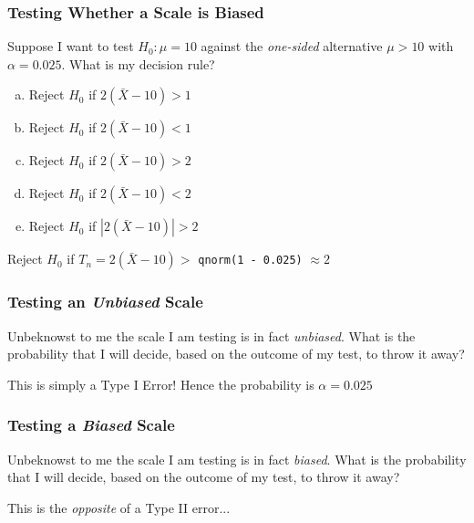 \documentclass{beamer}
\begin{document}
\begin{frame}[t]
	\frametitle{Testing Whether a Scale is Biased }

	\vspace{1em}

	Suppose I want to test $H_0\colon \mu = 10$ against the \emph{one-sided} alternative $\mu > 10$ with $\alpha = 0.025$. What is my decision rule? 

	\vspace{1em}

	\begin{enumerate}[(a)]
		\item Reject $H_0$ if $2(\bar{X} - 10) > 1$ 
		\item Reject $H_0$ if $2(\bar{X} - 10) < 1$ 
		\item Reject $H_0$ if $2(\bar{X} - 10) > 2$ 
		\item Reject $H_0$ if $2(\bar{X} - 10) < 2$ 
		\item Reject $H_0$ if $|2(\bar{X} - 10)| > 2$ 
	\end{enumerate}

	\pause
	\alert{Reject $H_0$ if $T_n = 2(\bar{X} - 10) >$ \texttt{qnorm(1 - 0.025)} $\approx 2$}
\end{frame}
\begin{frame}
	\frametitle{Testing an \emph{Unbiased} Scale}
	 Unbeknowst to me the scale I am testing is in fact \emph{unbiased}.
	 What is the probability that I will decide, based on the outcome of my test, to throw it away?

	 \vspace{2em}
	\pause

	\alert{This is simply a Type I Error! Hence the probability is $\alpha = 0.025$}
\end{frame}
\begin{frame}
	\frametitle{Testing a \emph{Biased} Scale}
	 Unbeknowst to me the scale I am testing is in fact \emph{biased}.
	 What is the probability that I will decide, based on the outcome of my test, to throw it away?

\pause

\vspace{1em}

\alert{This is the \emph{opposite} of a Type II error...}
\end{frame}
\end{document}
